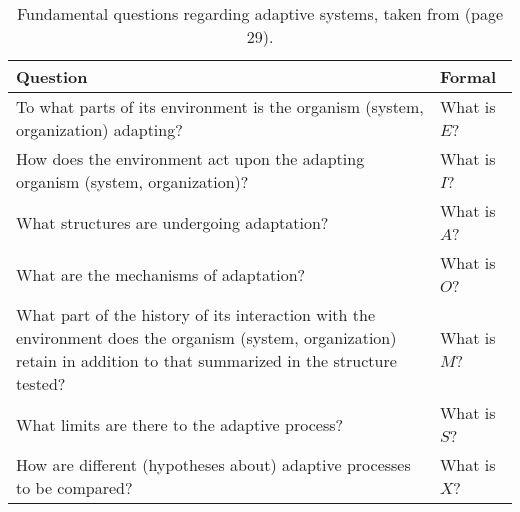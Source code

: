 \documentclass[a4paper, 11pt]{article}
\begin{document}
\begin{table}[ht]
	\centering\small
		\begin{tabularx}{\textwidth}{Xl}
		\toprule
		\textbf{Question} & \textbf{Formal} \\ 
		\toprule
		To what parts of its environment is the organism (system, organization) adapting? & What is $E$? \\ 
		\midrule
		How does the environment act upon the adapting organism (system, organization)? & What is $I$? \\ 
		\midrule
		What structures are undergoing adaptation? & What is $A$? \\ 
		\midrule
		What are the mechanisms of adaptation? & What is $O$? \\ 
		\midrule
		What part of the history of its interaction with the environment does the organism (system, organization) retain in addition to that summarized in the structure tested? & What is $M$? \\ 
		\midrule
		What limits are there to the adaptive process? & What is $S$? \\ 
		\midrule
		How are different (hypotheses about) adaptive processes to be compared? & What is $X$? \\ 
		\bottomrule
		\end{tabularx}	
	\caption{Fundamental questions regarding adaptive systems, taken from \cite{Holland1975} (page 29).}
	\label{tab:adaptsys:questions}
\end{table}


\end{document}

